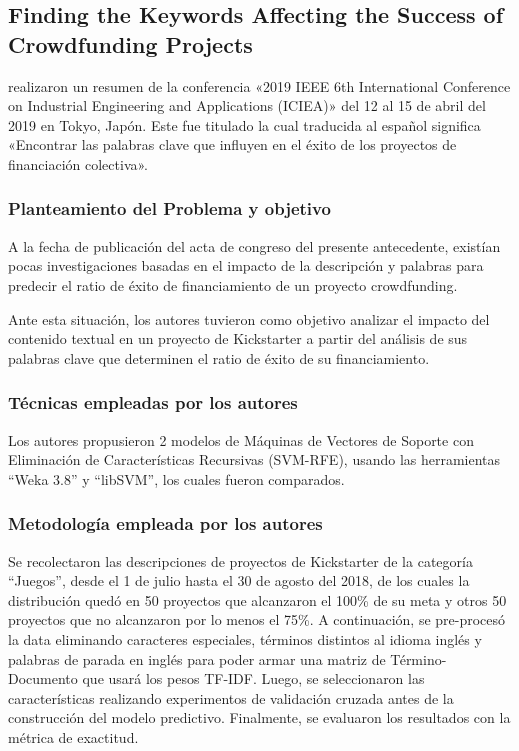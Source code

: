 \subsection{Finding the Keywords Affecting the Success of Crowdfunding Projects \citep*{pr_chen2019keywords_crowdfunding}}
\citeauthor{pr_chen2019keywords_crowdfunding} realizaron un resumen de la conferencia «2019 IEEE 6th International Conference on Industrial Engineering and Applications (ICIEA)» del 12 al 15 de abril del 2019 en Tokyo, Japón. Este fue titulado  la cual traducida al español significa «Encontrar las palabras clave que influyen en el éxito de los proyectos de financiación colectiva».

\subsubsection{Planteamiento del Problema y objetivo}
A la fecha de publicación del acta de congreso del presente antecedente, existían pocas investigaciones basadas en el impacto de la descripción y palabras para predecir el ratio de éxito de financiamiento de un proyecto crowdfunding.

Ante esta situación, los autores tuvieron como objetivo analizar el impacto del contenido textual en un proyecto de Kickstarter a partir del análisis de sus palabras clave que determinen el ratio de éxito de su financiamiento.

\subsubsection{Técnicas empleadas por los autores}
Los autores propusieron 2 modelos de Máquinas de Vectores de Soporte con Eliminación de Características Recursivas (SVM-RFE), usando las herramientas “Weka 3.8” y “libSVM”, los cuales fueron comparados.

\subsubsection{Metodología empleada por los autores}
Se recolectaron las descripciones de proyectos de Kickstarter de la categoría “Juegos”, desde el 1 de julio hasta el 30 de agosto del 2018, de los cuales la distribución quedó en 50 proyectos que alcanzaron el 100\% de su meta y otros 50 proyectos que no alcanzaron por lo menos el 75\%. A continuación, se pre-procesó la data eliminando caracteres especiales, términos distintos al idioma inglés y palabras de parada en inglés para poder armar una matriz de Término-Documento que usará los pesos TF-IDF. Luego, se seleccionaron las características realizando experimentos de validación cruzada antes de la construcción del modelo predictivo. Finalmente, se evaluaron los resultados con la métrica de exactitud.

